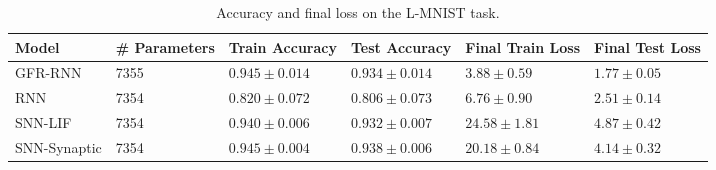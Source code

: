 \begin{table}
    \caption{Accuracy and final loss on the L-MNIST task.}
    \label{tab:rnn-snn-results}
    \centering
    \begin{tabular}{llllll}
    \toprule
    \textbf{Model} & \textbf{\# Parameters} & \textbf{Train Accuracy} & \textbf{Test Accuracy} & \textbf{Final Train Loss} & \textbf{Final Test Loss} \\
    \midrule
    GFR-RNN & 7355 & $0.945 \pm 0.014$ & $0.934 \pm 0.014$ & $3.88 \pm 0.59$ & $1.77 \pm 0.05$ \\
    RNN & 7354 & $0.820 \pm 0.072$ & $0.806 \pm 0.073$ & $6.76 \pm 0.90$ & $2.51 \pm 0.14$ \\
    SNN-LIF & 7354 & $0.940 \pm 0.006$ & $0.932 \pm 0.007$ & $24.58 \pm 1.81$ & $4.87 \pm 0.42$ \\
    SNN-Synaptic & 7354 & $0.945 \pm 0.004$ & $0.938 \pm 0.006$ & $20.18 \pm 0.84$ & $4.14 \pm 0.32$ \\
    \bottomrule
    \end{tabular}
\end{table}
